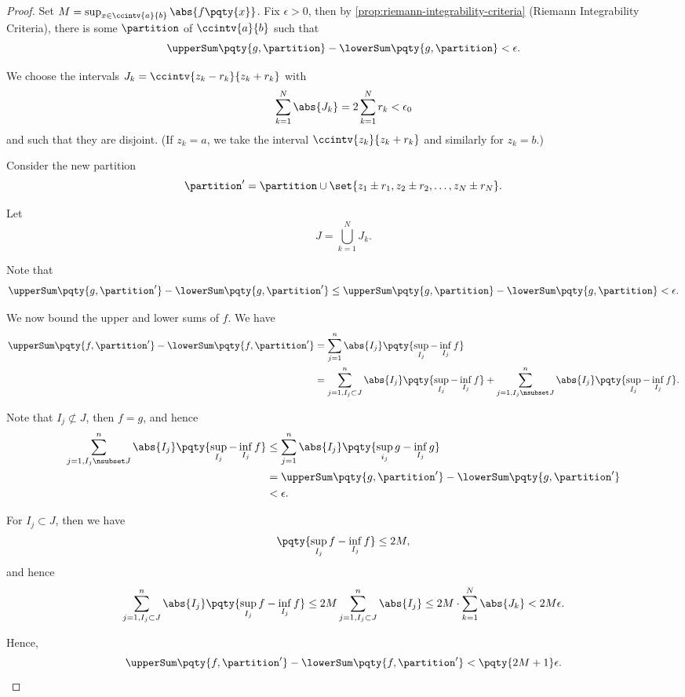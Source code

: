 \begin{proof}
    Set \(M = \sup_{x \in \ccintv{a}{b}} \abs{f\pqty{x}}\). Fix \(\epsilon > 0\), then by \autoref{prop:riemann-integrability-criteria} (Riemann Integrability Criteria), there is some \(\partition\) of \(\ccintv{a}{b}\) such that
    \[
        \upperSum\pqty{g, \partition} - \lowerSum\pqty{g, \partition} < \epsilon.
    \]

    We choose the intervals \(J_k = \ccintv{z_k - r_k}{z_k + r_k}\) with
    \[
        \sum_{k = 1}^{N} \abs{J_k} = 2 \sum_{k = 1}^{N} r_k < \epsilon_0
    \]
    and such that they are disjoint. (If \(z_k = a\), we take the interval \(\ccintv{z_k}{z_k + r_k}\) and similarly for \(z_k = b\).)

    Consider the new partition
    \[
        \partition' = \partition \cup \set{z_1 \pm r_1, z_2 \pm r_2, \ldots, z_N \pm r_N}.
    \]

    Let
    \[
        J = \bigcup_{k = 1}^{N} J_k.
    \]

    Note that
    \[
        \upperSum\pqty{g, \partition'} - \lowerSum\pqty{g, \partition'} \leq \upperSum\pqty{g, \partition} - \lowerSum\pqty{g, \partition} < \epsilon.
    \]

    We now bound the upper and lower sums of \(f\). We have
    \begin{align*}
        \upperSum\pqty{f, \partition'} - \lowerSum\pqty{f, \partition'} &= \sum_{j = 1}^{n} \abs{I_j} \pqty{\sup_{I_j} - \inf_{I_j} f} \\
        &= \sum_{j = 1, I_j \subset J}^{n} \abs{I_j} \pqty{\sup_{I_j} - \inf_{I_j} f} + \sum_{j = 1, I_j \nsubset J}^{n} \abs{I_j} \pqty{\sup_{I_j} - \inf_{I_j} f}.
    \end{align*}

    Note that \(I_j \nsubset J\), then \(f = g\), and hence
    \begin{align*}
        \sum_{j = 1, I_j \nsubset J}^{n} \abs{I_j} \pqty{\sup_{I_j} - \inf_{I_j} f} &\leq \sum_{j = 1}^{n} \abs{I_j} \pqty{\sup_{i_j} g - \inf_{I_j} g} \\
        &= \upperSum\pqty{g, \partition'} - \lowerSum\pqty{g, \partition'} \\
        &< \epsilon.
    \end{align*}

    For \(I_j \subset J\), then we have
    \[
        \pqty{\sup_{I_j} f - \inf_{I_j} f} \leq 2M,
    \]
    and hence
    \[
        \sum_{j = 1, I_j \subset J}^{n} \abs{I_j} \pqty{\sup_{I_j} f - \inf_{I_j} f} \leq 2M \sum_{j = 1, I_j \subset J}^{n} \abs{I_j} \leq 2M \cdot \sum_{k = 1}^{N} \abs{J_k} < 2M \epsilon.
    \]

    Hence,
    \[
        \upperSum\pqty{f, \partition'} - \lowerSum\pqty{f, \partition'} < \pqty{2M + 1} \epsilon.
    \]
\end{proof}

